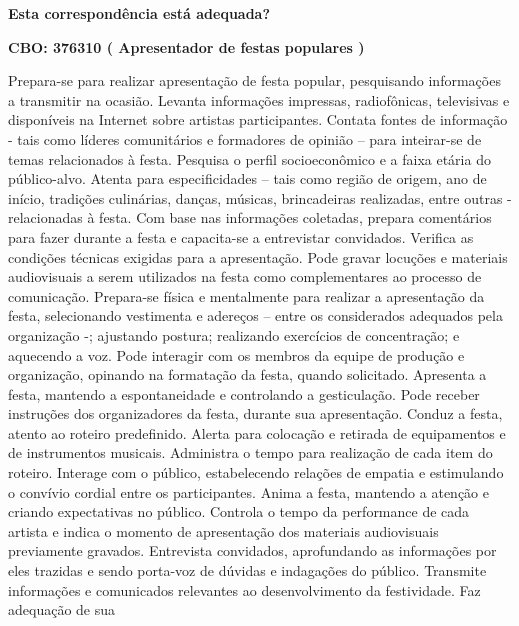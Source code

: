 \documentclass[
]{article}
\begin{document}
\begin{Form}
\textbf{Esta correspondência está adequada?} \\ 
\end{Form}

\textbf{CBO: 376310  ( Apresentador de festas populares )}

Prepara-se para realizar apresentação de festa popular, pesquisando
informações a transmitir na ocasião. Levanta informações impressas,
radiofônicas, televisivas e disponíveis na Internet sobre artistas
participantes. Contata fontes de informação - tais como líderes
comunitários e formadores de opinião -- para inteirar-se de temas
relacionados à festa. Pesquisa o perfil socioeconômico e a faixa etária
do público-alvo. Atenta para especificidades -- tais como região de
origem, ano de início, tradições culinárias, danças, músicas,
brincadeiras realizadas, entre outras - relacionadas à festa. Com base
nas informações coletadas, prepara comentários para fazer durante a
festa e capacita-se a entrevistar convidados. Verifica as condições
técnicas exigidas para a apresentação. Pode gravar locuções e materiais
audiovisuais a serem utilizados na festa como complementares ao processo
de comunicação. Prepara-se física e mentalmente para realizar a
apresentação da festa, selecionando vestimenta e adereços -- entre os
considerados adequados pela organização -; ajustando postura; realizando
exercícios de concentração; e aquecendo a voz. Pode interagir com os
membros da equipe de produção e organização, opinando na formatação da
festa, quando solicitado. Apresenta a festa, mantendo a espontaneidade e
controlando a gesticulação. Pode receber instruções dos organizadores da
festa, durante sua apresentação. Conduz a festa, atento ao roteiro
predefinido. Alerta para colocação e retirada de equipamentos e de
instrumentos musicais. Administra o tempo para realização de cada item
do roteiro. Interage com o público, estabelecendo relações de empatia e
estimulando o convívio cordial entre os participantes. Anima a festa,
mantendo a atenção e criando expectativas no público. Controla o tempo
da performance de cada artista e indica o momento de apresentação dos
materiais audiovisuais previamente gravados. Entrevista convidados,
aprofundando as informações por eles trazidas e sendo porta-voz de
dúvidas e indagações do público. Transmite informações e comunicados
relevantes ao desenvolvimento da festividade. Faz adequação de sua
\end{document}
